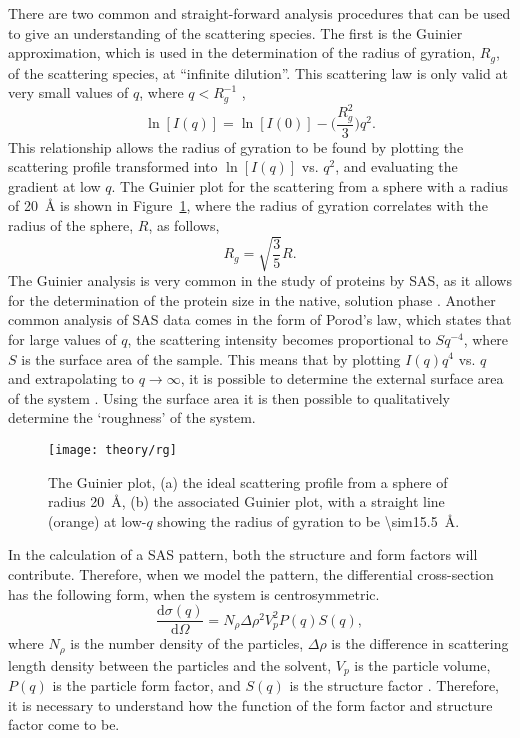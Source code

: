 There are two common and straight-forward analysis procedures that can be used to give an understanding of the scattering species.
The first is the Guinier approximation, which is used in the determination of the radius of gyration, $R_g$, of the scattering species, at ``infinite dilution''.
This scattering law is only valid at very small values of $q$, where $q < R_g^{-1}$ \cite{sivia_elementary_2011},
%
\begin{equation}
    \ln[I(q)] = \ln[I(0)] - \Bigg(\frac{R_g^2}{3}\Bigg)q^2.
\end{equation}
%
This relationship allows the radius of gyration to be found by plotting the scattering profile transformed into $\ln[I(q)]$ vs. $q^2$, and evaluating the gradient at low $q$.
The Guinier plot for the scattering from a sphere with a radius of \SI{20}{\angstrom} is shown in Figure~\ref{fig:rg}, where the radius of gyration correlates with the radius of the sphere, $R$, as follows,
%
\begin{equation}
    R_g = \sqrt{\frac{3}{5}}R.
\end{equation}
%
The Guinier analysis is very common in the study of proteins by SAS, as it allows for the determination of the protein size in the native, solution phase \cite{skou_synchrotron-based_2014}.
Another common analysis of SAS data comes in the form of Porod's law, which states that for large values of $q$, the scattering intensity becomes proportional to $Sq^{-4}$, where $S$ is the surface area of the sample.
This means that by plotting $I(q)q^4$ vs. $q$ and extrapolating to $q \rightarrow \infty$, it is possible to determine the external surface area of the system \cite{willis_experimental_2009}.
Using the surface area it is then possible to qualitatively determine the `roughness' of the system.
%
\begin{figure}
    \centering
    \texttt{[image: theory/rg]}
    \caption{The Guinier plot, (a) the ideal scattering profile from a sphere of radius \SI{20}{\angstrom}, (b) the associated Guinier plot, with a straight line (orange) at low-$q$ showing the radius of gyration to be \SI{\sim15.5}{\angstrom}.}
    \label{fig:rg}
\end{figure}
%

In the calculation of a SAS pattern, both the structure and form factors will contribute.
Therefore, when we model the pattern, the differential cross-section has the following form, when the system is centrosymmetric.
%
\begin{equation}
    \frac{\text{d}\sigma(q)}{\text{d}\Omega} = N_\rho\Delta\rho^2V_p^2 P(q)S(q),
\end{equation}
%
where $N_\rho$ is the number density of the particles, $\Delta\rho$ is the difference in scattering length density between the particles and the solvent, $V_p$ is the particle volume, $P(q)$ is the particle form factor, and $S(q)$ is the structure factor \cite{pedersen_monte_2002}.
Therefore, it is necessary to understand how the function of the form factor and structure factor come to be.


